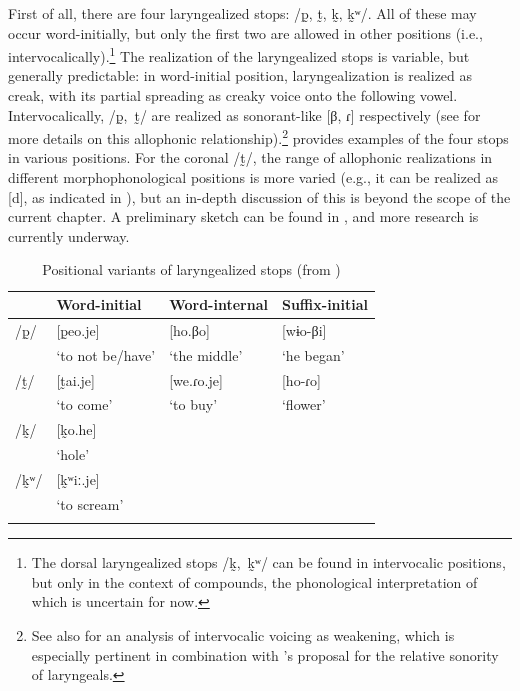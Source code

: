 \documentclass[output=paper]{langscibook}
\begin{document}
\largerpage
First of all, there are four laryngealized stops: /p̰, t̰, k̰, k̰ʷ/. All of these may occur word-initially, but only the first two are allowed in other positions (i.e., intervocalically).\footnote{The dorsal laryngealized stops \mbox{/k̰, k̰ʷ/} can be found in intervocalic positions, but only in the context of compounds, the phonological interpretation of which is uncertain for now.} The realization of the laryngealized stops is variable, but generally predictable: in word-initial position, laryngealization is realized as creak, with its partial spreading as creaky voice onto the following vowel. Intervocalically, \mbox{/p̰, t̰/} are realized as sonorant-like [β, ɾ] respectively (see \citealt[93--95]{Bruil:2014} for more details on this allophonic relationship).\footnote{See also \citet{BotmaVeer:2013} for an analysis of intervocalic voicing as weakening, which is especially pertinent in combination with \citet{GolstonKehrein:2015}'s proposal for the relative sonority of laryngeals.}  provides examples of the four stops in various positions. For the coronal \mbox{/t̰/}, the range of allophonic realizations in different morphophonological positions is more varied (e.g., it can be realized as [d], as indicated in ), but an in-depth discussion of this is beyond the scope of the current chapter. A preliminary sketch can be found in \citet{Bruil:2014}, and more research is currently underway.

\begin{table}\centering
\begin{tabular}{llll}\lsptoprule
		&	Word-initial	&	Word-internal	&	Suffix-initial	\\ \midrule
/p̰/	&	[p̰eo.je]	&	[ho.βo]		&	[wɨo-βi]	\\
		&	`to not be/have'	&	`the middle'	&	`he began'	\\
/t̰/	&	[t̰ai.je]	&	[we.ɾo.je]	&	[ho-ɾo]		\\
		&	`to come'		&	`to buy'		&	`flower'		\\
/k̰/	&	[k̰o.he]	&				&				\\
		&	`hole'		&				&				\\
/k̰ʷ/	&	[k̰ʷiː.je]	&		&				\\
		&	`to scream'	&				&				\\ \lspbottomrule				
\end{tabular}\caption{Positional variants of laryngealized stops (from \citealt[93]{Bruil:2014})}\label{tab-lar}
\end{table}
\end{document}
